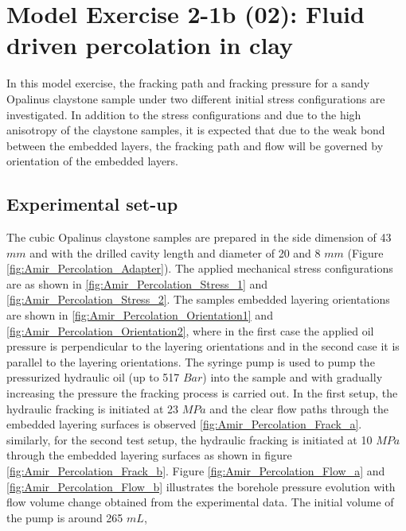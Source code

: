 \section{Model Exercise 2-1b (02): Fluid driven percolation in clay}
\label{sec:mex2-1b}
In this model exercise, the fracking path and fracking pressure for a sandy Opalinus claystone sample under two different initial stress configurations are investigated. In addition to the stress configurations and due to the high anisotropy of the claystone samples, it is expected that due to the weak bond between the embedded layers, the fracking path and flow will be governed by orientation of the embedded layers.  

\subsection{Experimental set-up}

The cubic Opalinus claystone samples are prepared in the side dimension of 43 $mm$ and with the drilled cavity length and diameter of 20 and 8 $mm$ (Figure \ref{fig:Amir_Percolation_Adapter}). The applied mechanical stress configurations are as shown in \ref{fig:Amir_Percolation_Stress_1} and \ref{fig:Amir_Percolation_Stress_2}. The samples embedded layering orientations are shown in \ref{fig:Amir_Percolation_Orientation1} and \ref{fig:Amir_Percolation_Orientation2}, where in the first case the applied oil pressure is perpendicular to the layering orientations and in the second case it is parallel to the layering orientations. The syringe pump is used to pump the pressurized hydraulic oil (up to 517 $Bar$) into the sample and with gradually increasing the pressure the fracking process is carried out. In the first setup, the hydraulic fracking is initiated at 23 $MPa$ and the clear flow paths through the embedded layering surfaces is observed \ref{fig:Amir_Percolation_Frack_a}. similarly, for the second test setup, the hydraulic fracking is initiated at 10 $MPa$ through the embedded layering surfaces as shown in figure \ref{fig:Amir_Percolation_Frack_b}. Figure \ref{fig:Amir_Percolation_Flow_a} and \ref{fig:Amir_Percolation_Flow_b} illustrates the borehole pressure evolution with flow volume change obtained from the experimental data. The initial volume of the pump is around 265 $mL$,


